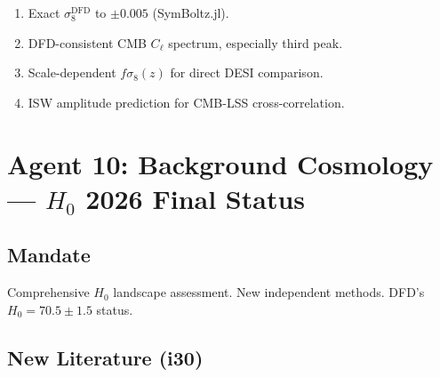 \documentclass[11pt,a4paper]{article}
\begin{document}
\begin{enumerate}
\item Exact $\sigma_8^\mathrm{DFD}$ to $\pm 0.005$ (SymBoltz.jl).
\item DFD-consistent CMB $C_\ell$ spectrum, especially third peak.
\item Scale-dependent $f\sigma_8(z)$ for direct DESI comparison.
\item ISW amplitude prediction for CMB-LSS cross-correlation.
\end{enumerate}

\section{Agent 10: Background Cosmology --- $H_0$ 2026 Final Status}

\subsection{Mandate}
Comprehensive $H_0$ landscape assessment. New independent methods. DFD's $H_0 = 70.5 \pm 1.5$ status.

\subsection{New Literature (i30)}
\end{document}
